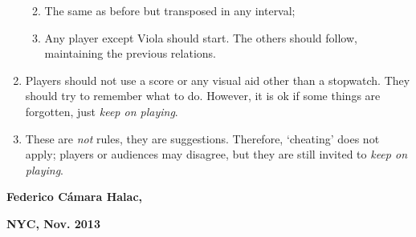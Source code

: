 \begin{enumerate}
  \begin{enumerate}
  \def\labelenumii{\arabic{enumii}.}
  \item
    The same as before but transposed in any interval;
  \item
    Any player except Viola should start. The others should follow,
    maintaining the previous relations.
  \end{enumerate}
\item
  Players should not use a score or any visual aid other than a
  stopwatch. They should try to remember what to do. However, it is ok
  if some things are forgotten, just \emph{keep on playing}.
\item
  These are \emph{not} rules, they are suggestions. Therefore,
  `cheating' does not apply; players or audiences may disagree, but they
  are still invited to \emph{keep on playing}.
\end{enumerate}

\textbf{Federico Cámara Halac,}

\textbf{NYC, Nov. 2013}
